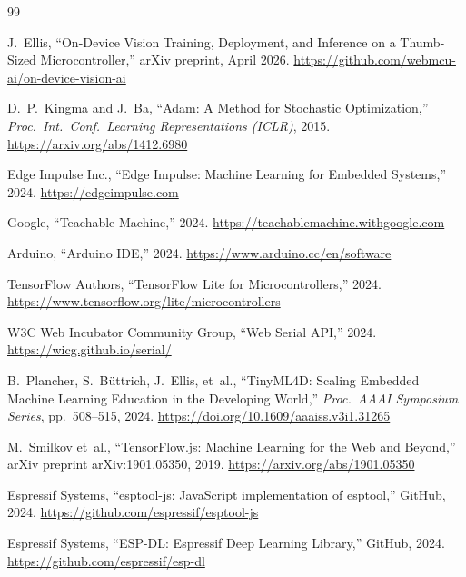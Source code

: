 \documentclass[11pt]{article}
\begin{document}
\begin{thebibliography}{99}

J.~Ellis,
``On-Device Vision Training, Deployment, and Inference on a Thumb-Sized
Microcontroller,''
arXiv preprint, April 2026.
\url{https://github.com/webmcu-ai/on-device-vision-ai}

D.~P.~Kingma and J.~Ba,
``Adam: A Method for Stochastic Optimization,''
\textit{Proc.\ Int.\ Conf.\ Learning Representations (ICLR)}, 2015.
\url{https://arxiv.org/abs/1412.6980}

Edge Impulse Inc.,
``Edge Impulse: Machine Learning for Embedded Systems,'' 2024.
\url{https://edgeimpulse.com}

Google,
``Teachable Machine,'' 2024.
\url{https://teachablemachine.withgoogle.com}

Arduino,
``Arduino IDE,'' 2024.
\url{https://www.arduino.cc/en/software}

TensorFlow Authors,
``TensorFlow Lite for Microcontrollers,'' 2024.
\url{https://www.tensorflow.org/lite/microcontrollers}

W3C Web Incubator Community Group,
``Web Serial API,'' 2024.
\url{https://wicg.github.io/serial/}

B.~Plancher, S.~B\"{u}ttrich, J.~Ellis, et~al.,
``TinyML4D: Scaling Embedded Machine Learning Education in the Developing World,''
\textit{Proc.\ AAAI Symposium Series}, pp.~508--515, 2024.
\url{https://doi.org/10.1609/aaaiss.v3i1.31265}

M.~Smilkov et~al.,
``TensorFlow.js: Machine Learning for the Web and Beyond,''
arXiv preprint arXiv:1901.05350, 2019.
\url{https://arxiv.org/abs/1901.05350}

Espressif Systems,
``esptool-js: JavaScript implementation of esptool,'' GitHub, 2024.
\url{https://github.com/espressif/esptool-js}

Espressif Systems,
``ESP-DL: Espressif Deep Learning Library,'' GitHub, 2024.
\url{https://github.com/espressif/esp-dl}

\end{thebibliography}
\end{document}
